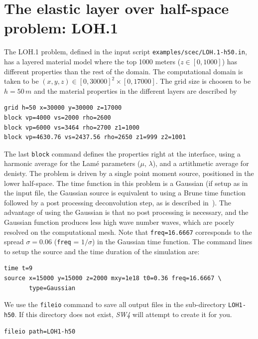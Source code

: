 \documentclass[11pt]{report}
\begin{document}
{\section{The elastic layer over half-space problem: LOH.1}
The LOH.1 problem, defined in the input script \verb+examples/scec/LOH.1-h50.in+, has a layered
material model where the top 1000 meters ($z\in [0, 1000]$) has different properties than the rest of the
domain. The computational domain is taken to be $(x,y,z) \in [0,30000]^2\times [0,17000]$. The
grid size is choosen to be $h=50\,m$ and the material properties in the
different layers are described by
\begin{verbatim}
grid h=50 x=30000 y=30000 z=17000
block vp=4000 vs=2000 rho=2600 
block vp=6000 vs=3464 rho=2700 z1=1000
block vp=4630.76 vs=2437.56 rho=2650 z1=999 z2=1001
\end{verbatim}
The last \verb+block+ command defines the properties right at the interface, using a harmonic
average for the Lam\'e parameters ($\mu$, $\lambda$), and a artithmetic average for denisty. The
problem is driven by a single point moment source, positioned in the lower half-space. The time
function in this problem is a Gaussian (if setup as in the input file, the Gaussian source is
equivalent to using a Brune time function followed by a post processing deconvolution step, as is
described in~\cite{Day-2001}). The advantage of using the Gaussian is that no post processing is
necessary, and the Gaussian function produces less high wave number waves, which are poorly resolved
on the computational mesh. Note that \verb+freq=16.6667+ corresponds to the spread $\sigma=0.06$
({\tt freq} = $1/\sigma$) in the Gaussian time function. The command lines to setup the source and
the time duration of the simulation are:
\begin{verbatim}
time t=9
source x=15000 y=15000 z=2000 mxy=1e18 t0=0.36 freq=16.6667 \ 
       type=Gaussian
\end{verbatim}

We use the \verb+fileio+ command to save all output files in the sub-directory
\verb+LOH1-h50+. If this directory does not exist, \emph{SW4} will attempt to create it for you.
\begin{verbatim}
fileio path=LOH1-h50
\end{verbatim}

}
\end{document}
